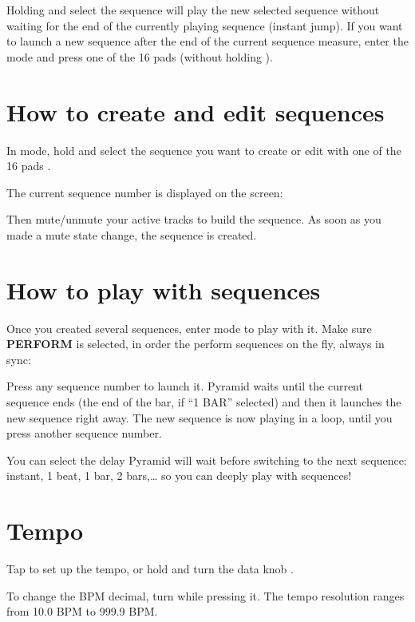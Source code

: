 Holding  and select the sequence will play the new selected sequence without waiting for the end of the currently playing sequence (instant jump). If you want to launch a new sequence after the end of the current sequence measure, enter the  mode and press one of the 16 pads \padsicon{} (without holding ).


\section{How to create and edit sequences}

In  mode, hold  and select the sequence you want to create or edit with one of the 16 pads \padsicon{}.

The current sequence number is displayed on the screen:


Then mute/unmute your active tracks to build the sequence. As soon as you made a mute state change, the sequence is created.


\section{How to play with sequences}

Once you created several sequences, enter  mode to play with it. Make sure \textbf{PERFORM} is selected, in order the perform sequences on the fly, always in sync:


Press any sequence number \padsicon{} to launch it. Pyramid waits until the current sequence ends (the end of the bar, if ``1 BAR'' selected) and then it launches the new sequence right away. The new sequence is now playing in a loop, until you press another sequence number.

You can select the delay Pyramid will wait before switching to the next sequence: instant, 1 beat, 1 bar, 2 bars,\ldots{} so you can deeply play with sequences!


\section{Tempo}

Tap  to set up the tempo, or hold  and turn the data knob \encodericon{}.

To change the BPM decimal, turn \encodericon{} while pressing it. The tempo resolution ranges from 10.0 BPM to 999.9 BPM.

